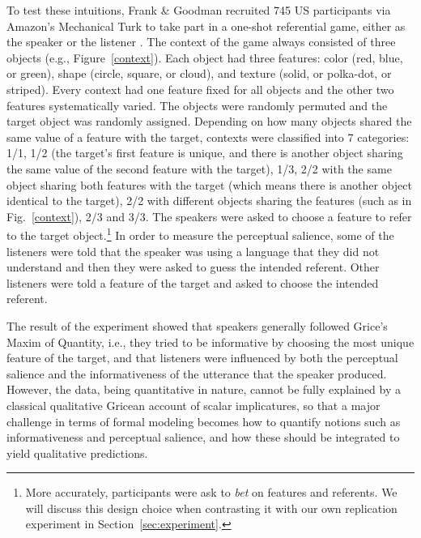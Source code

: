 To test these intuitions, Frank \& Goodman recruited 745 US
participants via Amazon's Mechanical Turk to take part in a one-shot
referential game, either as the speaker or the listener \cite{Frank}.
The context of the game always consisted of three objects (e.g.,
Figure~\ref{context}).  Each object had three features: color (red,
blue, or green), shape (circle, square, or cloud), and texture (solid,
or polka-dot, or striped).  Every context had one feature fixed for
all objects and the other two features systematically varied.  The
objects were randomly permuted and the target object was randomly
assigned.  Depending on how many objects shared the same value of a
feature with the target, contexts were classified into 7 categories:
1/1, 1/2 (the target's first feature is unique, and there is another
object sharing the same value of the second feature with the target),
1/3, 2/2 with the same object sharing both features with the target
(which means there is another object identical to the target), 2/2
with different objects sharing the features (such as in
Fig.~\ref{context}), 2/3 and 3/3. The speakers were asked to choose a
feature to refer to the target object.\footnote{More accurately,
  participants were ask to \emph{bet} on features and referents. We
  will discuss this design choice when contrasting it with our own
  replication experiment in Section~\ref{sec:experiment}.}  In order
to measure the perceptual salience, some of the listeners were told
that the speaker was using a language that they did not understand and
then they were asked to guess the intended referent.  Other listeners
were told a feature of the target and asked to choose the intended
referent.

The result of the experiment showed that speakers generally followed
Grice's Maxim of Quantity, i.e., they tried to be informative by
choosing the most unique feature of the target, and that listeners
were influenced by both the perceptual salience and the
informativeness of the utterance that the speaker produced. However,
the data, being quantitative in nature, cannot be fully explained by a
classical qualitative Gricean account of scalar implicatures, so that
a major challenge in terms of formal modeling becomes how to quantify
notions such as informativeness and perceptual salience, and how these
should be integrated to yield qualitative predictions.

